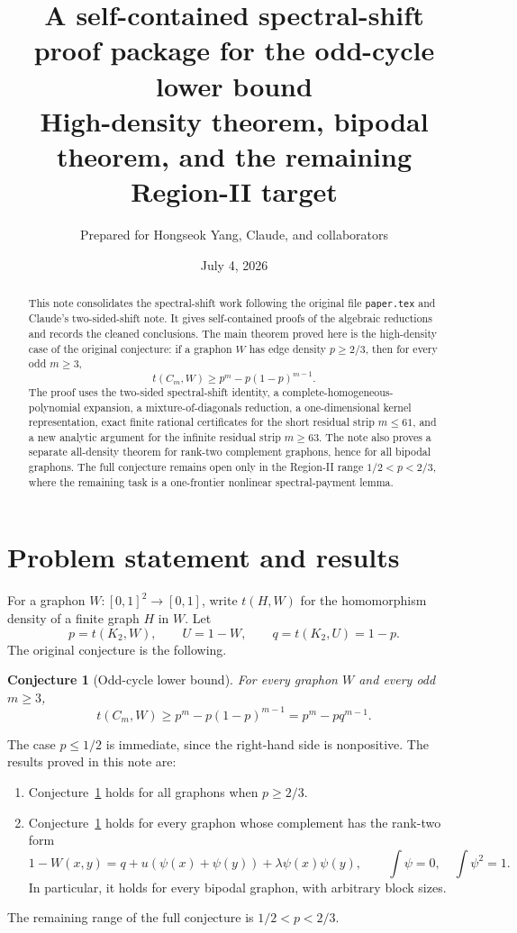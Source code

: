\documentclass[11pt]{article}
\title{A self-contained spectral-shift proof package for the odd-cycle lower bound\\
\large High-density theorem, bipodal theorem, and the remaining Region-II target}
\author{Prepared for Hongseok Yang, Claude, and collaborators}
\date{July 4, 2026}
\newtheorem{conjecture}[theorem]{Conjecture}
\begin{document}
\maketitle

\begin{abstract}
This note consolidates the spectral-shift work following the original file \texttt{paper.tex} and Claude's two-sided-shift note.  It gives self-contained proofs of the algebraic reductions and records the cleaned conclusions.  The main theorem proved here is the high-density case of the original conjecture: if a graphon $W$ has edge density $p\ge2/3$, then for every odd $m\ge3$,
\[
        t(C_m,W)\ge p^m-p(1-p)^{m-1}.
\]
The proof uses the two-sided spectral-shift identity, a complete-homogeneous-polynomial expansion, a mixture-of-diagonals reduction, a one-dimensional kernel representation, exact finite rational certificates for the short residual strip $m\le61$, and a new analytic argument for the infinite residual strip $m\ge63$.  The note also proves a separate all-density theorem for rank-two complement graphons, hence for all bipodal graphons.  The full conjecture remains open only in the Region-II range $1/2<p<2/3$, where the remaining task is a one-frontier nonlinear spectral-payment lemma.
\end{abstract}

\tableofcontents

\section{Problem statement and results}

For a graphon $W:[0,1]^2\to[0,1]$, write $t(H,W)$ for the homomorphism density of a finite graph $H$ in $W$.  Let
\[
        p=t(K_2,W),\qquad U=1-W,\qquad q=t(K_2,U)=1-p.
\]
The original conjecture is the following.

\begin{conjecture}[Odd-cycle lower bound]\label{conj:main}
For every graphon $W$ and every odd $m\ge3$,
\[
        t(C_m,W)\ge p^m-p(1-p)^{m-1}=p^m-pq^{m-1}.
\]
\end{conjecture}

The case $p\le1/2$ is immediate, since the right-hand side is nonpositive.  The results proved in this note are:
\begin{enumerate}[label=\textup{(\roman*)}, leftmargin=2em]
\item Conjecture~\ref{conj:main} holds for all graphons when $p\ge2/3$.
\item Conjecture~\ref{conj:main} holds for every graphon whose complement has the rank-two form
\[
        1-W(x,y)=q+u(\psi(x)+\psi(y))+\lambda\psi(x)\psi(y),
        \qquad \int\psi=0,
        \quad \int\psi^2=1.
\]
In particular, it holds for every bipodal graphon, with arbitrary block sizes.
\end{enumerate}
The remaining range of the full conjecture is $1/2<p<2/3$.
\end{document}
